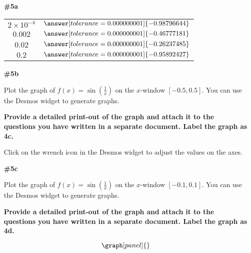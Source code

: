 \documentclass[handout,nooutcomes]{ximera}
\begin{document}
\begin{problem}
\begin{problem}{\textbf{\#5a}}
\begin{tabular}{|c|c|}
		$2\times10^{-4}$ & $\answer[tolerance=0.000000001]{-0.98796644}$ \\
		
		$0.002$ & $\answer[tolerance=0.000000001]{-0.46777181}$ \\
		
		$0.02$ & $\answer[tolerance=0.000000001]{-0.26237485}$ \\
		
		$0.2$ & $\answer[tolerance=0.000000001]{-0.95892427}$ \\
		
\end{tabular}
\end{problem}



\begin{problem}{\textbf{\#5b}}

Plot the graph of $f(x)=\sin\left(\frac{1}{x}\right)$ on the $x$-window $[-0.5,0.5]$. You can use the Desmos widget to generate graphs. 

\textbf{Provide a detailed print-out of the graph and attach it to the questions you have written in a separate document. Label the graph as 4c.}

\begin{hint}
Click on the wrench icon in the Desmos widget to adjust the values on the axes.
\end{hint}


\end{problem}

\begin{problem}{\textbf{\#5c}}

Plot the graph of $f(x)=\sin\left(\frac{1}{x}\right)$ on the $x$-window $[-0.1,0.1]$. You can use the Desmos widget to generate graphs. 

\textbf{Provide a detailed print-out of the graph and attach it to the questions you have written in a separate document. Label the graph as 4d.}

\end{problem}

\[
\graph[panel]{}
\]

\end{problem}
\end{document}
